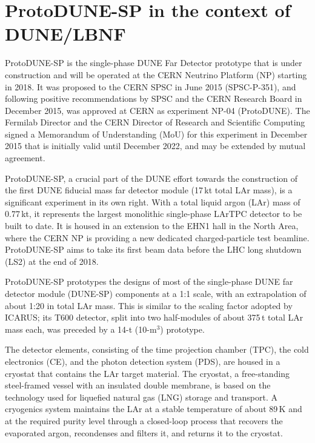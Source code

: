 
\section{ProtoDUNE-SP in the context of DUNE/LBNF}

ProtoDUNE-SP is the single-phase DUNE Far Detector prototype that is under construction and will be operated at the CERN Neutrino Platform (NP) 
starting in 2018. It was proposed to the CERN SPSC in June 2015 (SPSC-P-351), and following positive recommendations by SPSC and the CERN Research Board in December 2015, was approved at CERN as experiment NP-04 (ProtoDUNE). The Fermilab Director and the CERN Director of Research and Scientific Computing signed a Memorandum of Understanding (MoU) for this experiment in December 2015 that is initially valid until December 2022, 
and may be extended by mutual agreement. 

ProtoDUNE-SP, a crucial part of the DUNE effort towards the construction of the first DUNE  fiducial mass far detector module (17\,kt total LAr mass), is a significant experiment in its own right. With a total liquid argon (LAr) mass of 0.77\,kt, it represents the largest monolithic single-phase LArTPC detector to be built to date.  
It is housed in an extension to the EHN1 hall in the North Area, where the CERN NP is providing a new dedicated charged-particle test beamline. ProtoDUNE-SP aims to take its first beam data before the LHC long shutdown (LS2) at the end of 2018.

ProtoDUNE-SP prototypes the designs of most of the single-phase DUNE far detector module (DUNE-SP) components at a 1:1 scale, with an extrapolation of about 1:20 in total LAr mass. This is similar to the scaling factor adopted 
by ICARUS; its T600 detector, split into two half-modules of about 375\,t total LAr mass each, was preceded by a 14-t (10-m$^3$) prototype. 

The detector elements, consisting of the time projection chamber (TPC), the cold electronics (CE), and the photon detection system (PDS), are housed in a cryostat that contains the LAr target material. The cryostat, a free-standing steel-framed vessel with an insulated double membrane, is based on the technology used for liquefied natural gas (LNG) storage and transport. 
A cryogenics system maintains the LAr at a stable temperature of about 89\,K and at the required purity level  through a closed-loop process that recovers the evaporated argon, recondenses and filters it, and returns it to the cryostat. 

